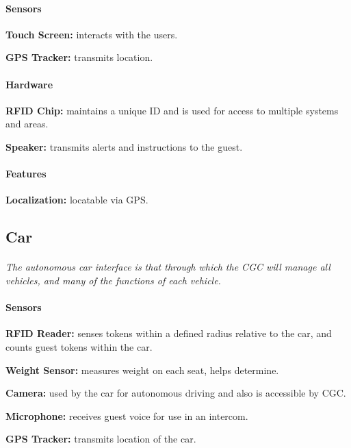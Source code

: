 \documentclass[12pt]{article}
\begin{document}
    \paragraph{Sensors}
    \begin{list}{}{}
        \item \textbf{Touch Screen:} interacts with the users. 
        \item \textbf{GPS Tracker:} transmits location. 
    \end{list}
        
    \paragraph{Hardware}
    \begin{list}{}{}
        \item \textbf{RFID Chip:} maintains a unique ID and is used for access to 
        multiple systems and areas.
        \item \textbf{Speaker:} transmits alerts and instructions to the guest.
    \end{list}

    \paragraph{Features}
    \begin{list}{}{}
        \item \textbf{Localization:} locatable via GPS.
    \end{list}

    \subsection{Car}
    \paragraph{} \textit{The autonomous car interface is that through which the CGC will
    manage all vehicles, and many of the functions of each vehicle.}
    
    \paragraph{Sensors}
    \begin{list}{}{}
        \item \textbf{RFID Reader:} senses tokens within a defined radius relative 
        to the car, and counts guest tokens within the car.
        \item \textbf{Weight Sensor:} measures weight on each seat, helps determine. 
        \item \textbf{Camera:} used by the car for autonomous driving and also 
        is accessible by CGC.
        \item \textbf{Microphone:} receives guest voice for use in an intercom.
        \item \textbf{GPS Tracker:} transmits location of the car.
    \end{list}
        
\end{document}
